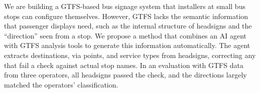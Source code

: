 We are building a GTFS-based bus signage system that installers at small bus stops can configure themselves.
However, GTFS lacks the semantic information that passenger displays need, such as the internal structure of headsigns and the ``direction'' seen from a stop.
We propose a method that combines an AI agent with GTFS analysis tools to generate this information automatically.
The agent extracts destinations, via points, and service types from headsigns, correcting any that fail a check against actual stop names.
In an evaluation with GTFS data from three operators, all headsigns passed the check, and the directions largely matched the operators' classification.
